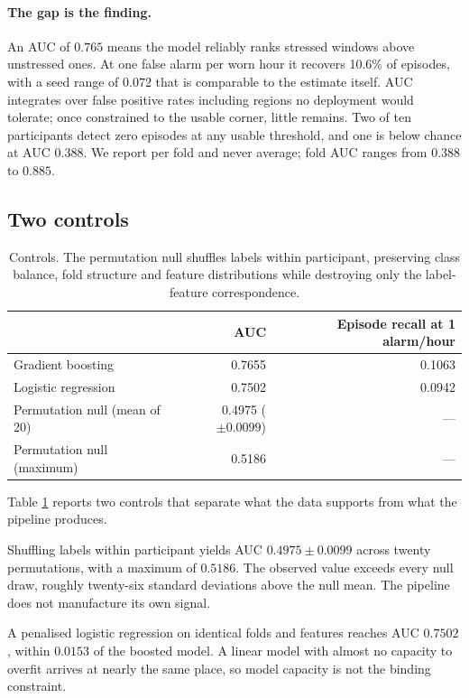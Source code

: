 \documentclass{article}
\begin{document}
\paragraph{The gap is the finding.} An AUC of $0.765$ means the model reliably
ranks stressed windows above unstressed ones. At one false alarm per worn hour
it recovers 10.6\% of episodes, with a seed range of $0.072$ that
is comparable to the estimate itself. AUC integrates over false positive rates
including regions no deployment would tolerate; once constrained to the usable
corner, little remains. Two of ten participants detect zero episodes at any
usable threshold, and one is below chance at AUC $0.388$. We report per fold
and never average; fold AUC ranges from $0.388$ to $0.885$.

\subsection{Two controls}

\begin{table}[t]
\caption{Controls. The permutation null shuffles labels within participant,
preserving class balance, fold structure and feature distributions while
destroying only the label-feature correspondence.}
\label{tab:controls}
\centering
\begin{tabular}{lrr}
\toprule
 & AUC & Episode recall at 1 alarm/hour \\
\midrule
Gradient boosting        & 0.7655 & 0.1063 \\
Logistic regression      & 0.7502 & 0.0942 \\
\midrule
Permutation null (mean of 20) & 0.4975 ($\pm 0.0099$) & --- \\
Permutation null (maximum)    & 0.5186 & --- \\
\bottomrule
\end{tabular}
\end{table}

Table \ref{tab:controls} reports two controls that separate what the data
supports from what the pipeline produces.

Shuffling labels within participant yields AUC $0.4975 \pm 0.0099$ across
twenty permutations, with a maximum of $0.5186$. The observed value exceeds
every null draw, roughly twenty-six standard deviations above the null mean.
The pipeline does not manufacture its own signal.

A penalised logistic regression on identical folds and features reaches AUC
$0.7502$, within $0.0153$ of the boosted model. A linear model with almost no
capacity to overfit arrives at nearly the same place, so model capacity is not
the binding constraint.
\end{document}
